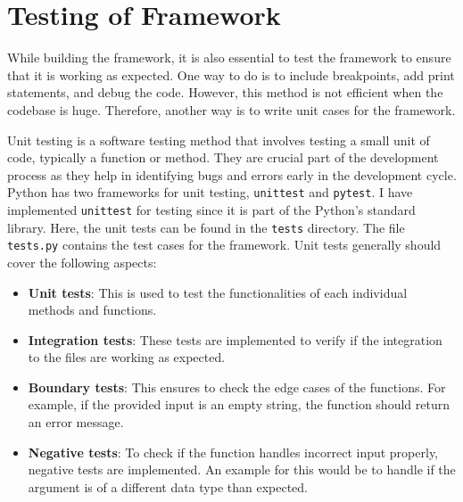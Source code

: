 \section{Testing of Framework}
While building the framework, it is also essential to test the framework to ensure that it is working as expected. One way to do is to include breakpoints, add print 
statements, and debug the code. However, this method is not efficient when the codebase is huge. Therefore, another way is to write unit cases for the framework.

Unit testing is a software testing method that involves testing a small unit of code, typically a function or method. They are crucial part of the development 
process as they help in identifying bugs and errors early in the development cycle. Python has two frameworks for unit testing, \texttt{unittest} and 
\texttt{pytest}. I have implemented \texttt{unittest} for testing since it is part of the Python's standard library. Here, the unit tests can be found 
in the \texttt{tests} directory. The file \texttt{tests.py} contains the test cases for the framework. Unit tests generally should cover the following aspects:
\begin{itemize}
  \item \textbf{Unit tests}:\newline
  This is used to test the functionalities of each individual methods and functions.
  \item \textbf{Integration tests}:\newline
  These tests are implemented to verify if the integration to the files are working as expected.
  \item \textbf{Boundary tests}:\newline
  This ensures to check the edge cases of the functions. For example, if the provided input is an empty string, the function should return an error message.
  \item \textbf{Negative tests}:\newline
  To check if the function handles incorrect input properly, negative tests are implemented. An example for this would be to handle if the argument is of a 
  different data type than expected. 
\end{itemize}


